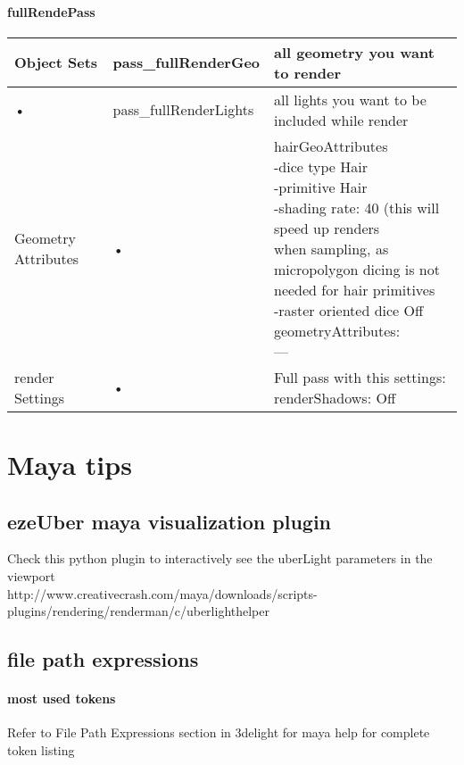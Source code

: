 \documentclass[final,letterpaper,twoside,12pt]{report}
\begin{document}
\subsubsection {fullRendePass}
\footnotesize
\begin{tabular}{|l|l|l|}
\hline 
Object Sets & pass\_fullRenderGeo  & all geometry you want to render\\
\hline 
• & pass\_fullRenderLights  & all lights you want to be included while render\\
\hline
Geometry Attributes & • & \parbox[t]{7cm}{hairGeoAttributes\\
-dice type Hair\\
-primitive Hair\\
-shading rate: 40 (this will speed up renders\\
when sampling, as micropolygon dicing is not\\
needed for hair primitives\\
-raster oriented dice Off\\
geometryAttributes:\\
---}
\\
\hline 
render Settings & • & 
\parbox[t]{5cm}{Full pass with this settings:\\
renderShadows: Off}
\\ 
\hline 
\end{tabular} 


\chapter{Maya tips}

\section {ezeUber maya visualization plugin}
Check this python plugin to interactively see the uberLight parameters in the viewport\\
http://www.creativecrash.com/maya/downloads/scripts-plugins/rendering/renderman/c/uberlighthelper

\section {file path expressions}
\subsubsection {most used tokens}
Refer to File Path Expressions section in 3delight for maya help for complete token listing\\
\end{document}
